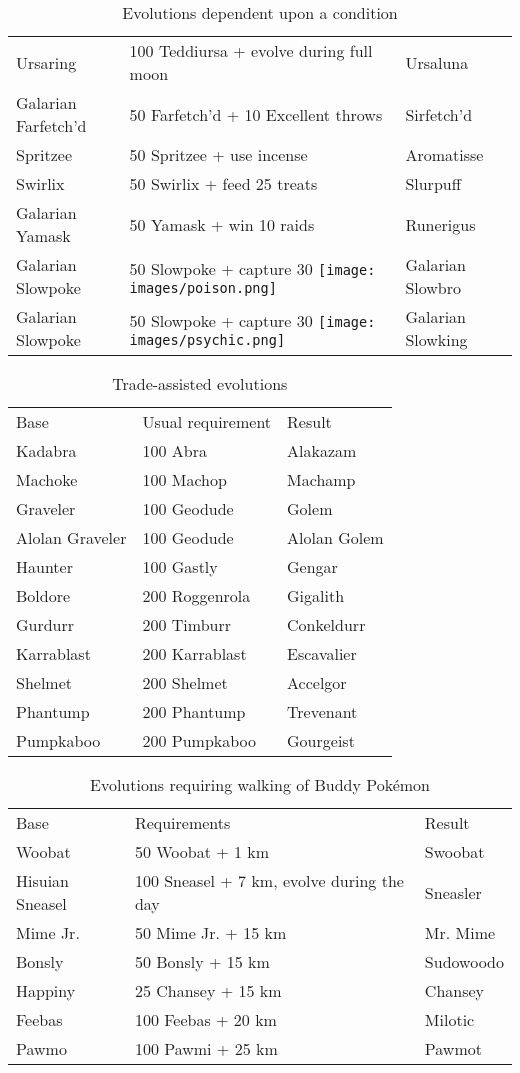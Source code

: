 \begin{table}
\begin{tabular}{lll}
  Ursaring & 100 Teddiursa + evolve during full moon & Ursaluna\\
  Galarian Farfetch'd & 50 Farfetch'd + 10 Excellent throws & Sirfetch'd \\
  Spritzee & 50 Spritzee + use incense & Aromatisse\\
  Swirlix & 50 Swirlix + feed 25 treats & Slurpuff\\
  Galarian Yamask & 50 Yamask + win 10 raids & Runerigus\\
  Galarian Slowpoke & 50 Slowpoke + capture 30 \texttt{[image: images/poison.png]} & Galarian Slowbro\\
  Galarian Slowpoke & 50 Slowpoke + capture 30 \texttt{[image: images/psychic.png]} & Galarian Slowking\\
\end{tabular}
  \caption{Evolutions dependent upon a condition\label{table:condevolutions}}
\end{table}
\begin{table}
\footnotesize
\centering
\begin{tabular}{lll}
  Base & Usual requirement & Result \\
\Midrule
Kadabra & 100 Abra & Alakazam\\
Machoke & 100 Machop & Machamp\\
  Graveler & 100 Geodude & Golem\\
  Alolan Graveler & 100 Geodude & Alolan Golem\\
  Haunter & 100 Gastly & Gengar\\
  Boldore & 200 Roggenrola & Gigalith\\
  Gurdurr & 200 Timburr & Conkeldurr\\
  Karrablast & 200 Karrablast & Escavalier\\
  Shelmet & 200 Shelmet & Accelgor\\
  Phantump & 200 Phantump & Trevenant\\
  Pumpkaboo & 200 Pumpkaboo & Gourgeist\\
\end{tabular}
  \caption{Trade-assisted evolutions\label{table:tradeevolution}}
\end{table}
\begin{table}
\footnotesize
\centering
\begin{tabular}{lll}
  Base & Requirements & Result \\
\Midrule
  Woobat & 50 Woobat + 1 km & Swoobat\\
  Hisuian Sneasel & 100 Sneasel + 7 km, evolve during the day & Sneasler\\
  Mime Jr. & 50 Mime Jr. + 15 km & Mr. Mime\\
  Bonsly & 50 Bonsly + 15 km & Sudowoodo\\
  Happiny & 25 Chansey + 15 km & Chansey\\
  Feebas & 100 Feebas + 20 km & Milotic\\
  Pawmo & 100 Pawmi + 25 km & Pawmot\\
\end{tabular}
  \caption{Evolutions requiring walking of Buddy Pokémon\label{table:walkevolutions}}
\end{table}
